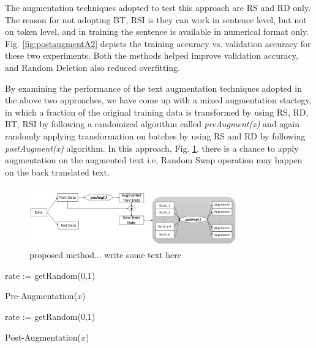 \documentclass{article}
\begin{document}
The augmentation techniques adopted to test this approach are RS and RD only. The reason for not adopting BT, RSI is they can work in sentence level, but not on token level, and in training the sentence is available in numerical format only. Fig. \ref{fig:postaugmentA2} depicts the training accuracy vs. validation accuracy for these two experiments. Both the methods helped improve validation accuracy, and Random Deletion also reduced overfitting.


By examining the performance of the text augmentation techniques adopted in the above two approaches, we have come up with a mixed augmentation startegy, in which a fraction of the original training data is transformed by using RS, RD, BT, RSI by following a randomized algorithm called \textit{preAugment(x)} and again randomly applying transformation on batches by using RS and RD by following \textit{postAugment(x)} algorithm. In this approach, Fig. \ref{fig:proposedapproach}, there is a chance to apply augmentation on the augmented text i.e, Random Swap operation may happen on the back translated text.

\begin{figure}[h!]
\centering
  \includegraphics[width=0.8\textwidth]{proposedmethod.jpg}
  \caption{proposed method... write some text here}
  \label{fig:proposedapproach}
\end{figure}

\begin{algorithm}[H]
\SetAlgoLined
{}
rate := getRandom(0,1) 
\caption{Pre-Augmentation($x$)}
\end{algorithm}


\begin{algorithm}[H]
\SetAlgoLined
{}
rate := getRandom(0,1)    
\caption{Post-Augmentation($x$)}
\end{algorithm}
\end{document}
